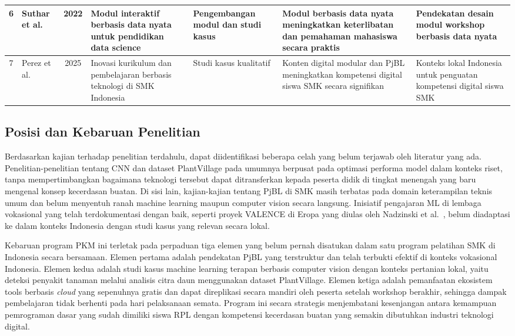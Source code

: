 \begin{longtable}{|c|p{1.8cm}|c|p{2.6cm}|p{1.9cm}|p{2.6cm}|p{2.4cm}|}
    6 &
    Suthar et al.\ \cite{Suthar2022} &
    2022 &
    Modul interaktif berbasis data nyata untuk pendidikan data science &
    Pengembangan modul dan studi kasus &
    Modul berbasis data nyata meningkatkan keterlibatan dan pemahaman mahasiswa secara praktis &
    Pendekatan desain modul workshop berbasis data nyata \\ \hline

    7 &
    Perez et al.\ \cite{Kurikulum2025} &
    2025 &
    Inovasi kurikulum dan pembelajaran berbasis teknologi di SMK Indonesia &
    Studi kasus kualitatif &
    Konten digital modular dan PjBL meningkatkan kompetensi digital siswa SMK secara signifikan &
    Konteks lokal Indonesia untuk penguatan kompetensi digital siswa SMK \\ \hline

\end{longtable}
\normalsize
\setlength{\tabcolsep}{6pt}

\subsection{Posisi dan Kebaruan Penelitian}
Berdasarkan kajian terhadap penelitian terdahulu, dapat diidentifikasi beberapa celah yang belum terjawab oleh literatur yang ada. Penelitian-penelitian tentang CNN dan dataset PlantVillage pada umumnya berpusat pada optimasi performa model dalam konteks riset, tanpa mempertimbangkan bagaimana teknologi tersebut dapat ditransferkan kepada peserta didik di tingkat menengah yang baru mengenal konsep kecerdasan buatan. Di sisi lain, kajian-kajian tentang PjBL di SMK masih terbatas pada domain keterampilan teknis umum dan belum menyentuh ranah machine learning maupun computer vision secara langsung. Inisiatif pengajaran ML di lembaga vokasional yang telah terdokumentasi dengan baik, seperti proyek VALENCE di Eropa yang diulas oleh Nadzinski et al.\ \cite{Nadzinski2023}, belum diadaptasi ke dalam konteks Indonesia dengan studi kasus yang relevan secara lokal.

Kebaruan program PKM ini terletak pada perpaduan tiga elemen yang belum pernah disatukan dalam satu program pelatihan SMK di Indonesia secara bersamaan. Elemen pertama adalah pendekatan PjBL yang terstruktur dan telah terbukti efektif di konteks vokasional Indonesia. Elemen kedua adalah studi kasus machine learning terapan berbasis computer vision dengan konteks pertanian lokal, yaitu deteksi penyakit tanaman melalui analisis citra daun menggunakan dataset PlantVillage. Elemen ketiga adalah pemanfaatan ekosistem tools berbasis \textit{cloud} yang sepenuhnya gratis dan dapat direplikasi secara mandiri oleh peserta setelah workshop berakhir, sehingga dampak pembelajaran tidak berhenti pada hari pelaksanaan semata. Program ini secara strategis menjembatani kesenjangan antara kemampuan pemrograman dasar yang sudah dimiliki siswa RPL dengan kompetensi kecerdasan buatan yang semakin dibutuhkan industri teknologi digital.
